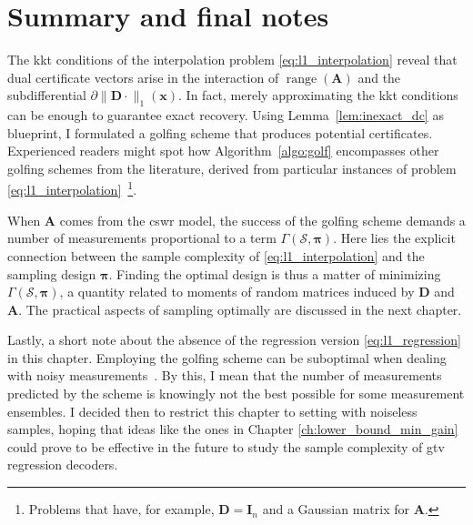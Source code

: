 \section{Summary and final notes}

The \acrfull{kkt} conditions of the interpolation problem \eqref{eq:l1_interpolation} reveal that dual certificate vectors arise in the interaction of $\operatorname{range} \left( \mathbf{A} \right)$ and the subdifferential $\partial \|\mathbf{D} \cdot \|_1 (\mathbf{x})$. In fact, merely approximating the \acrshort{kkt} conditions can be enough to guarantee exact recovery. Using Lemma~\ref{lem:inexact_dc} as blueprint, I formulated a golfing scheme that produces potential certificates. Experienced readers might spot how Algorithm~\ref{algo:golf} encompasses other golfing schemes from the literature, derived from particular instances of problem \eqref{eq:l1_interpolation}~\footnote{Problems that have, for example, $\mathbf{D} = \mathbf{I}_n$ and a Gaussian matrix for $\mathbf{A}$.}.

When $\mathbf{A}$ comes from the \acrshort{cswr} model, the success of the golfing scheme demands a number of measurements proportional to a term $\Gamma(\mathcal{S}, \bm{\pi})$. Here lies the explicit connection between the sample complexity of \eqref{eq:l1_interpolation} and the sampling design $\bm{\pi}$. Finding the optimal design is thus a matter of minimizing $\Gamma(\mathcal{S}, \bm{\pi})$, a quantity related to moments of random matrices induced by $\mathbf{D}$ and $\mathbf{A}$. The practical aspects of sampling optimally are discussed in the next chapter.

Lastly, a short note about the absence of the regression version \eqref{eq:l1_regression} in this chapter. Employing the golfing scheme can be suboptimal when dealing with noisy measurements~\cite{krahmer2019}. By this, I mean that the number of measurements predicted by the scheme is knowingly not the best possible for some measurement ensembles. I decided then to restrict this chapter to setting with noiseless samples, hoping that ideas like the ones in Chapter \ref{ch:lower_bound_min_gain} could prove to be effective in the future to study the sample complexity of \acrshort{gtv} regression decoders.

\clearpage


